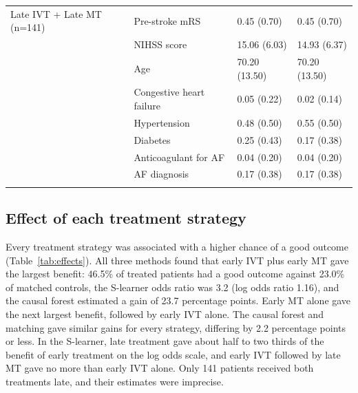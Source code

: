 {\begin{longtable}[]{@{}llll@{}}
Late IVT + Late MT (n=141) & Pre-stroke mRS & 0.45 (0.70) & 0.45 (0.70) \\
& NIHSS score & 15.06 (6.03) & 14.93 (6.37) \\
& Age & 70.20 (13.50) & 70.20 (13.50) \\
& Congestive heart failure & 0.05 (0.22) & 0.02 (0.14) \\
& Hypertension & 0.48 (0.50) & 0.55 (0.50) \\
& Diabetes & 0.25 (0.43) & 0.17 (0.38) \\
& Anticoagulant for AF & 0.04 (0.20) & 0.04 (0.20) \\
& AF diagnosis & 0.17 (0.38) & 0.17 (0.38) \\
\bottomrule
\label{tab:matching}
\end{longtable}
}

\subsection{Effect of each treatment strategy}

Every treatment strategy was associated with a higher chance of a good outcome (Table~\ref{tab:effects}). All three methods found that early IVT plus early MT gave the largest benefit: 46.5\% of treated patients had a good outcome against 23.0\% of matched controls, the S-learner odds ratio was 3.2 (log odds ratio 1.16), and the causal forest estimated a gain of 23.7 percentage points. Early MT alone gave the next largest benefit, followed by early IVT alone. The causal forest and matching gave similar gains for every strategy, differing by 2.2 percentage points or less. In the S-learner, late treatment gave about half to two thirds of the benefit of early treatment on the log odds scale, and early IVT followed by late MT gave no more than early IVT alone. Only 141 patients received both treatments late, and their estimates were imprecise.

